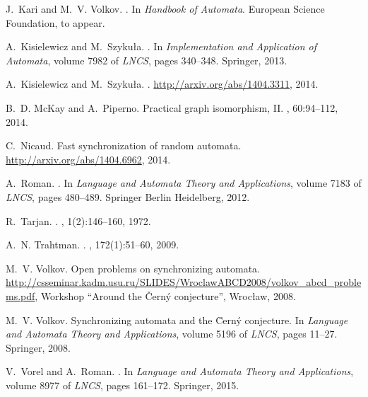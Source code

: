 \documentclass[runningheads]{llncs}
\begin{document}
\begin{thebibliography}{10}
J.~Kari and M.~V. Volkov.
.
\newblock In {\em Handbook of Automata}. European Science Foundation, to
  appear.

A.~Kisielewicz and M.~Szyku{\l}a.
.
\newblock In {\em Implementation and Application of Automata}, volume 7982 of
  {\em LNCS}, pages 340--348. Springer, 2013.

A.~Kisielewicz and M.~Szyku{\l}a.
.
\newblock \url{http://arxiv.org/abs/1404.3311}, 2014.

B.~D. McKay and A.~Piperno.
\newblock Practical graph isomorphism, {II}.
, 60:94--112, 2014.

C.~Nicaud.
\newblock Fast synchronization of random automata.
\newblock \url{http://arxiv.org/abs/1404.6962}, 2014.

A.~Roman.
.
\newblock In {\em Language and Automata Theory and Applications}, volume 7183
  of {\em LNCS}, pages 480--489. Springer Berlin Heidelberg, 2012.

R.~Tarjan.
.
, 1(2):146--160, 1972.

A.~N. Trahtman.
.
, 172(1):51--60, 2009.

M.~V. Volkov.
\newblock Open problems on synchronizing automata.
\newblock
  \small\url{http://csseminar.kadm.usu.ru/SLIDES/WroclawABCD2008/volkov_abcd_problems.pdf},
  Workshop ``Around the {\v{C}ern\'{y}} conjecture'', Wroc{\l}aw, 2008.

M.~V. Volkov.
\newblock Synchronizing automata and the \u{C}ern\'{y} conjecture.
\newblock In {\em Language and Automata Theory and Applications}, volume 5196
  of {\em LNCS}, pages 11--27. Springer, 2008.

V.~Vorel and A.~Roman.
.
\newblock In {\em Language and Automata Theory and Applications}, volume 8977
  of {\em LNCS}, pages 161--172. Springer, 2015.

\end{thebibliography}
\end{document}
